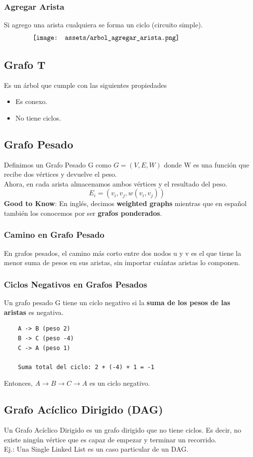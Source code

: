\documentclass[10pt,a4paper]{article}
\begin{document}
\subsubsection*{Agregar Arista}
Si agrego una arista cualquiera se forma un ciclo (circuito simple).
\[\begin{minipage}[b]{0.8\textwidth}
    \texttt{[image: assets/arbol\_agregar\_arista.png]}
\end{minipage}\]
\subsection*{Grafo T}
Es un árbol que cumple con las siguientes propiedades
\begin{itemize}
    \item Es conexo.
    \item No tiene ciclos. 
\end{itemize}
\subsection*{Grafo Pesado}
Definimos un Grafo Pesado G como $G = (V, E, W)$ donde W es una función que recibe dos vértices y devuelve el peso. \\
Ahora, en cada arista almacenamos ambos vértices y el resultado del peso. 
\[E_{i} = (v_{i}, v_{j}, w(v_{i},v_{j}))\]
\textbf{Good to Know}: En inglés, decimos \textbf{weighted graphs} mientras que en español también los conocemos por ser \textbf{grafos ponderados}.
\subsubsection*{Camino en Grafo Pesado}
En grafos pesados, el camino más corto entre dos nodos u y v es el que tiene la menor suma de pesos en sus aristas, sin importar cuántas aristas lo componen.
\subsubsection*{Ciclos Negativos en Grafos Pesados}
Un grafo pesado G tiene un ciclo negativo si la \textbf{suma de los pesos de las aristas} es negativa. 
\begin{lstlisting}
    A -> B (peso 2)
    B -> C (peso -4)
    C -> A (peso 1)

    Suma total del ciclo: 2 + (-4) + 1 = -1
\end{lstlisting}
Entonces, $ A \rightarrow B \rightarrow C \rightarrow A$ es un ciclo negativo.
\subsection*{Grafo Acíclico Dirigido (DAG)}
Un Grafo Acíclico Dirigido es un grafo dirigido que no tiene ciclos. Es decir, no existe ningún vértice que es capaz de empezar y terminar un recorrido. \\
Ej.: Una Single Linked List es un caso particular de un DAG.
\end{document}
